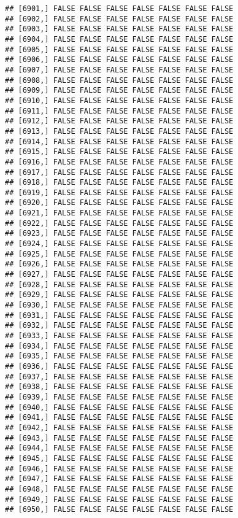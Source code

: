 \documentclass[
]{article}
\begin{document}
\begin{verbatim}
## [6901,] FALSE FALSE FALSE FALSE FALSE FALSE FALSE
## [6902,] FALSE FALSE FALSE FALSE FALSE FALSE FALSE
## [6903,] FALSE FALSE FALSE FALSE FALSE FALSE FALSE
## [6904,] FALSE FALSE FALSE FALSE FALSE FALSE FALSE
## [6905,] FALSE FALSE FALSE FALSE FALSE FALSE FALSE
## [6906,] FALSE FALSE FALSE FALSE FALSE FALSE FALSE
## [6907,] FALSE FALSE FALSE FALSE FALSE FALSE FALSE
## [6908,] FALSE FALSE FALSE FALSE FALSE FALSE FALSE
## [6909,] FALSE FALSE FALSE FALSE FALSE FALSE FALSE
## [6910,] FALSE FALSE FALSE FALSE FALSE FALSE FALSE
## [6911,] FALSE FALSE FALSE FALSE FALSE FALSE FALSE
## [6912,] FALSE FALSE FALSE FALSE FALSE FALSE FALSE
## [6913,] FALSE FALSE FALSE FALSE FALSE FALSE FALSE
## [6914,] FALSE FALSE FALSE FALSE FALSE FALSE FALSE
## [6915,] FALSE FALSE FALSE FALSE FALSE FALSE FALSE
## [6916,] FALSE FALSE FALSE FALSE FALSE FALSE FALSE
## [6917,] FALSE FALSE FALSE FALSE FALSE FALSE FALSE
## [6918,] FALSE FALSE FALSE FALSE FALSE FALSE FALSE
## [6919,] FALSE FALSE FALSE FALSE FALSE FALSE FALSE
## [6920,] FALSE FALSE FALSE FALSE FALSE FALSE FALSE
## [6921,] FALSE FALSE FALSE FALSE FALSE FALSE FALSE
## [6922,] FALSE FALSE FALSE FALSE FALSE FALSE FALSE
## [6923,] FALSE FALSE FALSE FALSE FALSE FALSE FALSE
## [6924,] FALSE FALSE FALSE FALSE FALSE FALSE FALSE
## [6925,] FALSE FALSE FALSE FALSE FALSE FALSE FALSE
## [6926,] FALSE FALSE FALSE FALSE FALSE FALSE FALSE
## [6927,] FALSE FALSE FALSE FALSE FALSE FALSE FALSE
## [6928,] FALSE FALSE FALSE FALSE FALSE FALSE FALSE
## [6929,] FALSE FALSE FALSE FALSE FALSE FALSE FALSE
## [6930,] FALSE FALSE FALSE FALSE FALSE FALSE FALSE
## [6931,] FALSE FALSE FALSE FALSE FALSE FALSE FALSE
## [6932,] FALSE FALSE FALSE FALSE FALSE FALSE FALSE
## [6933,] FALSE FALSE FALSE FALSE FALSE FALSE FALSE
## [6934,] FALSE FALSE FALSE FALSE FALSE FALSE FALSE
## [6935,] FALSE FALSE FALSE FALSE FALSE FALSE FALSE
## [6936,] FALSE FALSE FALSE FALSE FALSE FALSE FALSE
## [6937,] FALSE FALSE FALSE FALSE FALSE FALSE FALSE
## [6938,] FALSE FALSE FALSE FALSE FALSE FALSE FALSE
## [6939,] FALSE FALSE FALSE FALSE FALSE FALSE FALSE
## [6940,] FALSE FALSE FALSE FALSE FALSE FALSE FALSE
## [6941,] FALSE FALSE FALSE FALSE FALSE FALSE FALSE
## [6942,] FALSE FALSE FALSE FALSE FALSE FALSE FALSE
## [6943,] FALSE FALSE FALSE FALSE FALSE FALSE FALSE
## [6944,] FALSE FALSE FALSE FALSE FALSE FALSE FALSE
## [6945,] FALSE FALSE FALSE FALSE FALSE FALSE FALSE
## [6946,] FALSE FALSE FALSE FALSE FALSE FALSE FALSE
## [6947,] FALSE FALSE FALSE FALSE FALSE FALSE FALSE
## [6948,] FALSE FALSE FALSE FALSE FALSE FALSE FALSE
## [6949,] FALSE FALSE FALSE FALSE FALSE FALSE FALSE
## [6950,] FALSE FALSE FALSE FALSE FALSE FALSE FALSE

\end{verbatim}
\end{document}
